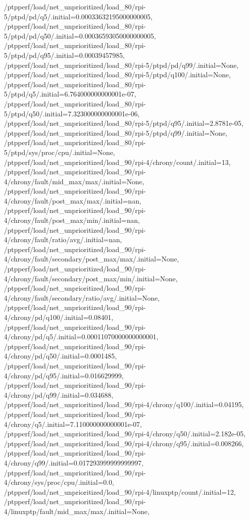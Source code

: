 {    /ptpperf/load/net_unprioritized/load_80/rpi-5/ptpd/pd/q5/.initial=0.00033632195000000005,
    /ptpperf/load/net_unprioritized/load_80/rpi-5/ptpd/pd/q50/.initial=0.00036593050000000005,
    /ptpperf/load/net_unprioritized/load_80/rpi-5/ptpd/pd/q95/.initial=0.00039457985,
    /ptpperf/load/net_unprioritized/load_80/rpi-5/ptpd/pd/q99/.initial=None,
    /ptpperf/load/net_unprioritized/load_80/rpi-5/ptpd/q100/.initial=None,
    /ptpperf/load/net_unprioritized/load_80/rpi-5/ptpd/q5/.initial=6.764000000000001e-07,
    /ptpperf/load/net_unprioritized/load_80/rpi-5/ptpd/q50/.initial=7.323000000000001e-06,
    /ptpperf/load/net_unprioritized/load_80/rpi-5/ptpd/q95/.initial=2.8781e-05,
    /ptpperf/load/net_unprioritized/load_80/rpi-5/ptpd/q99/.initial=None,
    /ptpperf/load/net_unprioritized/load_80/rpi-5/ptpd/sys/proc/cpu/.initial=None,
    /ptpperf/load/net_unprioritized/load_90/rpi-4/chrony/count/.initial=13,
    /ptpperf/load/net_unprioritized/load_90/rpi-4/chrony/fault/mid_max/max/.initial=None,
    /ptpperf/load/net_unprioritized/load_90/rpi-4/chrony/fault/post_max/max/.initial=nan,
    /ptpperf/load/net_unprioritized/load_90/rpi-4/chrony/fault/post_max/min/.initial=nan,
    /ptpperf/load/net_unprioritized/load_90/rpi-4/chrony/fault/ratio/avg/.initial=nan,
    /ptpperf/load/net_unprioritized/load_90/rpi-4/chrony/fault/secondary/post_max/max/.initial=None,
    /ptpperf/load/net_unprioritized/load_90/rpi-4/chrony/fault/secondary/post_max/min/.initial=None,
    /ptpperf/load/net_unprioritized/load_90/rpi-4/chrony/fault/secondary/ratio/avg/.initial=None,
    /ptpperf/load/net_unprioritized/load_90/rpi-4/chrony/pd/q100/.initial=0.08401,
    /ptpperf/load/net_unprioritized/load_90/rpi-4/chrony/pd/q5/.initial=0.00011070000000000001,
    /ptpperf/load/net_unprioritized/load_90/rpi-4/chrony/pd/q50/.initial=0.0001485,
    /ptpperf/load/net_unprioritized/load_90/rpi-4/chrony/pd/q95/.initial=0.016629999,
    /ptpperf/load/net_unprioritized/load_90/rpi-4/chrony/pd/q99/.initial=0.034688,
    /ptpperf/load/net_unprioritized/load_90/rpi-4/chrony/q100/.initial=0.04195,
    /ptpperf/load/net_unprioritized/load_90/rpi-4/chrony/q5/.initial=7.110000000000001e-07,
    /ptpperf/load/net_unprioritized/load_90/rpi-4/chrony/q50/.initial=2.182e-05,
    /ptpperf/load/net_unprioritized/load_90/rpi-4/chrony/q95/.initial=0.008266,
    /ptpperf/load/net_unprioritized/load_90/rpi-4/chrony/q99/.initial=0.017293999999999997,
    /ptpperf/load/net_unprioritized/load_90/rpi-4/chrony/sys/proc/cpu/.initial=0.0,
    /ptpperf/load/net_unprioritized/load_90/rpi-4/linuxptp/count/.initial=12,
    /ptpperf/load/net_unprioritized/load_90/rpi-4/linuxptp/fault/mid_max/max/.initial=None,
}
